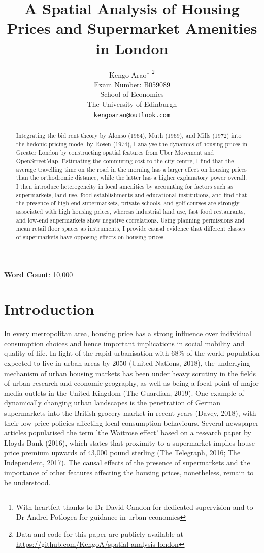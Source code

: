 \documentclass{article}
\title{A Spatial Analysis of Housing Prices and Supermarket Amenities in London}
\author{
  \large{Kengo Arao}\thanks{With heartfelt thanks to Dr David Candon for dedicated supervision and to Dr Andrei Potlogea for guidance in urban economics}      \thanks{Data and code for this paper are publicly available at \href{https://github.com/KengoA/spatial-analysis-london}{https://github.com/KengoA/spatial-analysis-london}} \\
  Exam Number: B059089 \\
  School of Economics\\
  The University of Edinburgh\\
  \texttt{kengoarao@outlook.com}
}
\begin{document}
\maketitle

\begin{abstract}
Integrating the bid rent theory by Alonso (1964), Muth (1969), and Mills (1972) into the hedonic pricing model by Rosen (1974), I analyse the dynamics of housing prices in Greater London by constructing spatial features from Uber Movement and OpenStreetMap. Estimating the commuting cost to the city centre, I find that the average travelling time on the road in the morning has a larger effect on housing prices than the orthodromic distance, while the latter has a higher explanatory power overall. I then introduce heterogeneity in local amenities by accounting for factors such as supermarkets, land use, food establishments and educational institutions, and find that the presence of high-end supermarkets, private schools, and golf courses are strongly associated with high housing prices, whereas industrial land use, fast food restaurants, and low-end supermarkets show negative correlations. Using planning permissions and mean retail floor spaces as instruments, I provide causal evidence that different classes of supermarkets have opposing effects on housing prices.

\end{abstract}

\begin{center}
    \textbf{Word Count}: 10,000
\end{center}

\newpage
\tableofcontents

\newpage
\section{Introduction} \label{section:intro}
In every metropolitan area, housing price has a strong influence over individual consumption choices and hence important implications in social mobility and quality of life. In light of the rapid urbanisation with 68\% of the world population expected to live in urban areas by 2050 (United Nations, 2018), the underlying mechanism of urban housing markets has been under heavy scrutiny in the fields of urban research and economic geography, as well as being a focal point of major media outlets in the United Kingdom (The Guardian, 2019). One example of dynamically changing urban landscapes is the penetration of German supermarkets into the British grocery market in recent years (Davey, 2018), with their low-price policies affecting local consumption behaviours. Several newspaper articles popularised the term 'the Waitrose effect' based on a research paper by Lloyds Bank (2016), which states that proximity to a supermarket implies house price premium upwards of 43,000 pound sterling (The Telegraph, 2016; The Independent, 2017). The causal effects of the presence of supermarkets and the importance of other features affecting the housing prices, nonetheless, remain to be understood.
 
\end{document}
